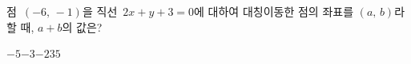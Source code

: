점~$(-6,\,-1)$을 직선~$2x+y+3=0$에 대하여 대칭이동한 점의 좌표를 $(a,\,b)$라 할 때, $a+b$의 값은?
\begin{choices32}{$-5$}{$-3$}{$-2$}{$3$}{$5$}\end{choices32}
